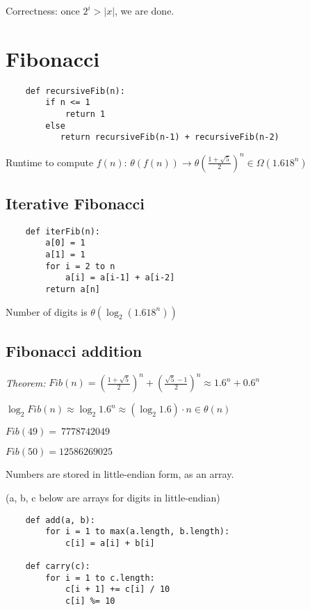 \documentclass[english,openany]{book}
\begin{document}
    Correctness: once $2^i > |x|$, we are done.\\

    \section{Fibonacci}

    \begin{lstlisting}
    def recursiveFib(n):
        if n <= 1
            return 1
        else
           return recursiveFib(n-1) + recursiveFib(n-2)
    \end{lstlisting}

    Runtime to compute $f(n)$: $\theta(f(n)) \rightarrow \theta(\frac{1+\sqrt{5}}{2})^n \in \Omega(1.618^n)$\\

    \subsection{Iterative Fibonacci}

    \begin{lstlisting}
    def iterFib(n):
        a[0] = 1
        a[1] = 1
        for i = 2 to n
            a[i] = a[i-1] + a[i-2]
        return a[n]
    \end{lstlisting}

    Number of digits is $\theta(\log_2 (1.618^n))$


    \subsection{Fibonacci addition}

    \textit{Theorem:} $Fib(n) = \left(  \frac{1+\sqrt{5}}{2}  \right) ^n + \left(  \frac{\sqrt{5} - 1}{2}  \right) ^n \approx 1.6^n + 0.6^n$

    $\log_2 Fib(n) \approx \log_2 1.6^n \approx (\log_2 1.6) \cdot n \in \theta(n)$

    $Fib(49) =\ 7778742049$

    $Fib(50) = 12586269025$

    Numbers are stored in little-endian form, as an array.

    (a, b, c below are arrays for digits in little-endian)

    \begin{lstlisting}
    def add(a, b):
        for i = 1 to max(a.length, b.length):
            c[i] = a[i] + b[i]

    def carry(c):
        for i = 1 to c.length:
            c[i + 1] += c[i] / 10
            c[i] %= 10
    \end{lstlisting}
\end{document}
